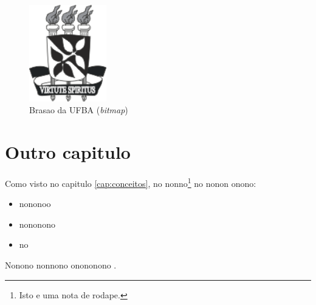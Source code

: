 \begin{figure}
\centering
\includegraphics[width=0.3\textwidth]{brasaoUFBA}
\caption{Brasao da UFBA (\emph{bitmap})}
\label{fig:ufba2}
\end{figure}


\chapter{Outro capitulo}
\label{cap:outrocapitulo}

Como visto no capitulo \ref{cap:conceitos}, no nonno\footnote{Isto e uma nota
de rodape.} no nonon onono:
\begin{itemize}
  \item{nononoo}
  \item{nononono}
  \item{no}
\end{itemize}


Nonono nonnono onononono \cite{fowler2000}.
